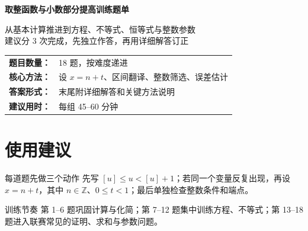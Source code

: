 \documentclass[11pt,a4paper,fontset=fandol]{ctexart}
\begin{document}
\thispagestyle{empty}
\begin{titlepage}\centering\vspace*{0.9cm}
\begin{tcolorbox}[enhanced,width=0.92\textwidth,colback=white,colframe=mainblue,boxrule=1pt,arc=0mm,left=6mm,right=6mm,top=8mm,bottom=8mm]
\centering
{\fontsize{24}{30}\selectfont\bfseries 取整函数与小数部分提高训练题单\par}
\vspace{1cm}
\begin{tcolorbox}[colback=lightblue,colframe=mainblue,width=0.84\textwidth,boxrule=1pt]
\centering
{\large 从基本计算推进到方程、不等式、恒等式与整数参数}\\[0.35em]
{\normalsize 建议分 3 次完成，先独立作答，再用详细解答订正}
\end{tcolorbox}
\vspace{1cm}
\renewcommand{\arraystretch}{1.42}
\begin{tabular}{>{\bfseries}p{3.4cm}p{8cm}}
题目数量： & 18 题，按难度递进 \\
核心方法： & 设 $x=n+t$、区间翻译、整数筛选、误差估计 \\
答案形式： & 末尾附详细解答和关键方法说明 \\
建议用时： & 每组 45--60 分钟
\end{tabular}
\vspace{0.9cm}{\large \today\par}
\end{tcolorbox}\end{titlepage}
\tableofcontents\newpage

\section{使用建议}
\begin{infobox}{每道题先做三个动作}
先写 $[u]\le u<[u]+1$；若同一个变量反复出现，再设 $x=n+t$，其中 $n\in\mathbb Z$、$0\le t<1$；最后单独检查整数条件和端点。
\end{infobox}
\begin{notebox}{训练节奏}
第 1--6 题巩固计算与化简；第 7--12 题集中训练方程、不等式；第 13--18 题进入联赛常见的证明、求和与参数问题。
\end{notebox}
\end{document}
